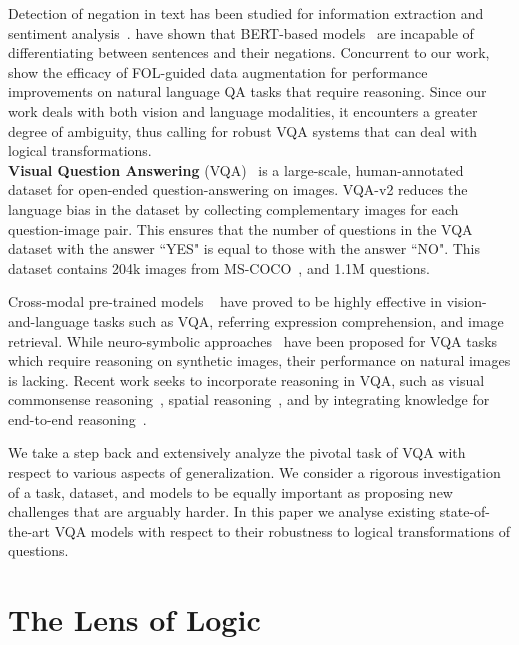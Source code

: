 Detection of negation in text has been studied for information extraction and sentiment analysis~\citep{morante2012modality}.
\citep{kassner2019negated} have shown that BERT-based models~\citep{devlin2018bert,liu2019roberta} are incapable of differentiating between sentences and their negations.
Concurrent to our work,~\citep{asai-hajishirzi-2020-logic} show the efficacy of FOL-guided data augmentation for performance improvements on natural language QA tasks that require reasoning.
Since our work deals with both vision and language modalities, it encounters a greater degree of ambiguity, thus calling for robust VQA systems that can deal with logical transformations.\\

\noindent\textbf{Visual Question Answering}
(VQA)~\citep{antol2015vqa} is a large-scale, human-annotated dataset for open-ended question-answering on images.
VQA-v2\citep{goyal2017making} reduces the language bias in the dataset by collecting complementary images for each question-image pair.
This ensures that the number of questions in the VQA dataset with the answer ``YES" is equal to those with the answer ``NO".
This dataset contains 204k images from MS-COCO~\citep{lin2014microsoft}, and 1.1M questions.

Cross-modal pre-trained models ~\citep{tan2019lxmert,lu2019vilbert,zhou2020unified} have proved to be highly effective in vision-and-language tasks such as VQA, referring expression comprehension, and image retrieval. 
While neuro-symbolic approaches~\citep{Mao2019NeuroSymbolic} have been proposed for VQA tasks which require reasoning on synthetic images, their performance on natural images is lacking.
Recent work seeks to incorporate reasoning in VQA, such as visual commonsense reasoning~\citep{zellers2019recognition,fang2020video2commonsense}, spatial reasoning~\citep{hudson2019gqa,johnson2017clevr}, and by integrating knowledge for end-to-end reasoning~\citep{Aditya:2019:IKR:3367722.3367926}.

We take a step back and extensively analyze the pivotal task of VQA with respect to various aspects of generalization.
We consider a rigorous investigation of a task, dataset, and models to be equally important as proposing new challenges that are arguably harder.
In this paper we analyse existing state-of-the-art VQA models with respect to their robustness to logical transformations of questions.

\section{The Lens of Logic}



